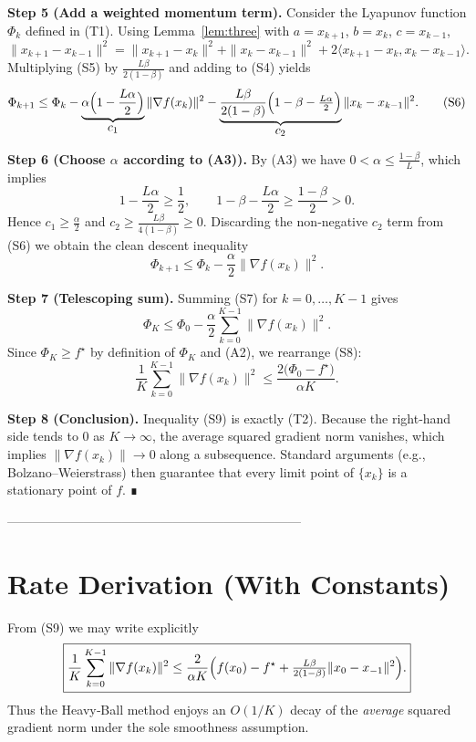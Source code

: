 \documentclass{article}
\begin{document}
\noindent\textbf{Step 5 (Add a weighted momentum term).}  
Consider the Lyapunov function $\Phi_{k}$ defined in (T1).  Using Lemma~\ref{lem:three}
with $a=x_{k+1}$, $b=x_{k}$, $c=x_{k-1}$,
\[
\|x_{k+1}-x_{k-1}\|^{2}= \|x_{k+1}-x_{k}\|^{2}
+\|x_{k}-x_{k-1}\|^{2}+2\langle x_{k+1}-x_{k},x_{k}-x_{k-1}\rangle .
\tag{S5}
\]
Multiplying (S5) by $\frac{L\beta}{2(1-\beta)}$ and adding to (S4) yields
\[
\Phi_{k+1}\le \Phi_{k}
-\underbrace{\alpha\Bigl(1-\frac{L\alpha}{2}\Bigr)}_{\displaystyle c_{1}}\|\nabla f(x_{k})\|^{2}
-\underbrace{\frac{L\beta}{2(1-\beta)}\Bigl(1-\beta-\tfrac{L\alpha}{2}\Bigr)}_{\displaystyle c_{2}}\|x_{k}-x_{k-1}\|^{2}.
\tag{S6}
\]

\noindent\textbf{Step 6 (Choose $\alpha$ according to (A3)).}  
By (A3) we have $0<\alpha\le\frac{1-\beta}{L}$, which implies
\[
1-\frac{L\alpha}{2}\ge\frac{1}{2},\qquad
1-\beta-\frac{L\alpha}{2}\ge\frac{1-\beta}{2}>0.
\]
Hence $c_{1}\ge\frac{\alpha}{2}$ and $c_{2}\ge\frac{L\beta}{4(1-\beta)}\ge0$.
Discarding the non‑negative $c_{2}$ term from (S6) we obtain the clean descent inequality
\[
\Phi_{k+1}\le \Phi_{k}-\frac{\alpha}{2}\|\nabla f(x_{k})\|^{2}.
\tag{S7}
\]

\noindent\textbf{Step 7 (Telescoping sum).}  
Summing (S7) for $k=0,\dots,K-1$ gives
\[
\Phi_{K}\le \Phi_{0}-\frac{\alpha}{2}\sum_{k=0}^{K-1}\|\nabla f(x_{k})\|^{2}.
\tag{S8}
\]
Since $\Phi_{K}\ge f^{\star}$ by definition of $\Phi_{K}$ and (A2), we rearrange (S8):
\[
\frac{1}{K}\sum_{k=0}^{K-1}\|\nabla f(x_{k})\|^{2}
\le \frac{2\bigl(\Phi_{0}-f^{\star}\bigr)}{\alpha K}.
\tag{S9}
\]

\noindent\textbf{Step 8 (Conclusion).}  
Inequality (S9) is exactly (T2).  Because the right‑hand side tends to $0$ as $K\to\infty$,
the average squared gradient norm vanishes, which implies $\|\nabla f(x_{k})\|\to0$ along a subsequence.
Standard arguments (e.g., Bolzano–Weierstrass) then guarantee that every limit point of $\{x_{k}\}$
is a stationary point of $f$.  ∎

---------------------------------------------------------------------

\section*{Rate Derivation (With Constants)}

From (S9) we may write explicitly
\[
\boxed{
\frac{1}{K}\sum_{k=0}^{K-1}\|\nabla f(x_{k})\|^{2}
\le
\frac{2}{\alpha K}\Bigl(f(x_{0})-f^{\star}
+\tfrac{L\beta}{2(1-\beta)}\|x_{0}-x_{-1}\|^{2}\Bigr).
}
\]
Thus the Heavy‑Ball method enjoys an $O(1/K)$ decay of the \emph{average} squared gradient
norm under the sole smoothness assumption.
\end{document}
